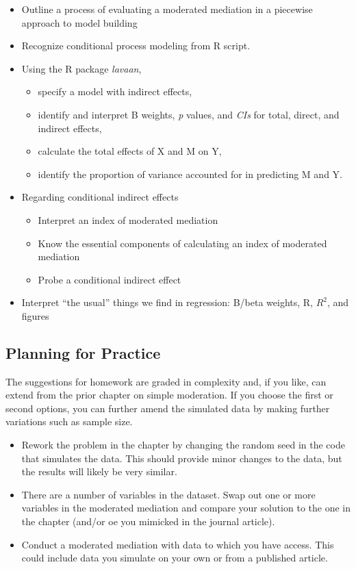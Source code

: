 \documentclass[
  english,
]{book}
\providecommand{\tightlist}{%
  \setlength{\itemsep}{0pt}\setlength{\parskip}{0pt}}
\begin{document}
\begin{itemize}
\tightlist
\item
  Outline a process of evaluating a moderated mediation in a piecewise \citep{hayes_introduction_2018} approach to model building
\item
  Recognize conditional process modeling from R script.
\item
  Using the R package \emph{lavaan},

  \begin{itemize}
  \tightlist
  \item
    specify a model with indirect effects,
  \item
    identify and interpret B weights, \emph{p} values, and \emph{CIs} for total, direct, and indirect effects,\\
  \item
    calculate the total effects of X and M on Y,
  \item
    identify the proportion of variance accounted for in predicting M and Y.
  \end{itemize}
\item
  Regarding conditional indirect effects

  \begin{itemize}
  \tightlist
  \item
    Interpret an index of moderated mediation
  \item
    Know the essential components of calculating an index of moderated mediation
  \item
    Probe a conditional indirect effect
  \end{itemize}
\item
  Interpret ``the usual'' things we find in regression: B/beta weights, R, \(R^{2}\), and figures
\end{itemize}

\hypertarget{planning-for-practice-6}{%
\subsection{Planning for Practice}\label{planning-for-practice-6}}

The suggestions for homework are graded in complexity and, if you like, can extend from the prior chapter on simple moderation. If you choose the first or second options, you can further amend the simulated data by making further variations such as sample size.

\begin{itemize}
\tightlist
\item
  Rework the problem in the chapter by changing the random seed in the code that simulates the data. This should provide minor changes to the data, but the results will likely be very similar.
\item
  There are a number of variables in the dataset. Swap out one or more variables in the moderated mediation and compare your solution to the one in the chapter (and/or oe you mimicked in the journal article).
\item
  Conduct a moderated mediation with data to which you have access. This could include data you simulate on your own or from a published article.
\end{itemize}
\end{document}
